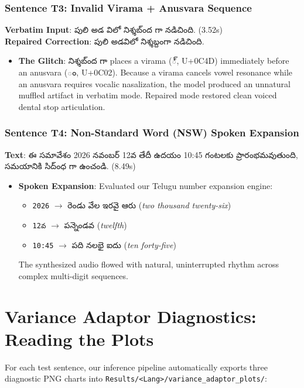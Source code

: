 \documentclass[11pt,a4paper]{article}
\newcommand{\te}[1]{{\telugufont #1}}
\begin{document}
\subsubsection{Sentence T3: Invalid Virama + Anusvara Sequence}
\textbf{Verbatim Input}: \te{పులి అడ విలో నిశ్శబ్ంద గా నడిచింది.} (3.52s) \\
\textbf{Repaired Correction}: \te{పులి అడవిలో నిశ్శబ్దంగా నడిచింది.}
\begin{itemize}
  \item \textbf{The Glitch}: \te{నిశ్శబ్ంద గా} places a virama (\te{్}, U+0C4D) immediately before an anusvara (\te{ం}, U+0C02). Because a virama cancels vowel resonance while an anusvara requires vocalic nasalization, the model produced an unnatural muffled artifact in verbatim mode. Repaired mode restored clean voiced dental stop articulation.
\end{itemize}

\subsubsection{Sentence T4: Non-Standard Word (NSW) Spoken Expansion}
\textbf{Text}: \te{ఈ సమావేశం 2026 నవంబర్ 12వ తేదీ ఉదయం 10:45 గంటలకు ప్రారంభమవుతుంది, సమయానికి సిద్ంధ గా ఉంచండి.} (8.49s)
\begin{itemize}
  \item \textbf{Spoken Expansion}: Evaluated our Telugu number expansion engine:
  \begin{itemize}
    \item \texttt{2026} $\rightarrow$ \te{రెండు వేల ఇరవై ఆరు} (\textit{two thousand twenty-six})
    \item \texttt{12వ} $\rightarrow$ \te{పన్నెండవ} (\textit{twelfth})
    \item \texttt{10:45} $\rightarrow$ \te{పది నలభై ఐదు} (\textit{ten forty-five})
  \end{itemize}
  The synthesized audio flowed with natural, uninterrupted rhythm across complex multi-digit sequences.
\end{itemize}

\newpage

\section{Variance Adaptor Diagnostics: Reading the Plots}

For each test sentence, our inference pipeline automatically exports three diagnostic PNG charts into \texttt{Results/<Lang>/variance\_adaptor\_plots/}:
\end{document}
